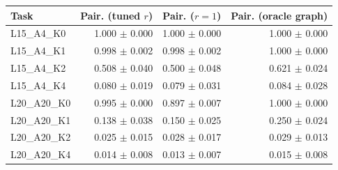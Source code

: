 \begin{tabular}{lrrr}
\toprule
Task & Pair. (tuned $r$) & Pair. ($r{=}1$) & Pair. (oracle graph)\\
\midrule
L15\_A4\_K0 & 1.000 $\pm$ 0.000 & 1.000 $\pm$ 0.000 & 1.000 $\pm$ 0.000\\
L15\_A4\_K1 & 0.998 $\pm$ 0.002 & 0.998 $\pm$ 0.002 & 1.000 $\pm$ 0.000\\
L15\_A4\_K2 & 0.508 $\pm$ 0.040 & 0.500 $\pm$ 0.048 & 0.621 $\pm$ 0.024\\
L15\_A4\_K4 & 0.080 $\pm$ 0.019 & 0.079 $\pm$ 0.031 & 0.084 $\pm$ 0.028\\
L20\_A20\_K0 & 0.995 $\pm$ 0.000 & 0.897 $\pm$ 0.007 & 1.000 $\pm$ 0.000\\
L20\_A20\_K1 & 0.138 $\pm$ 0.038 & 0.150 $\pm$ 0.025 & 0.250 $\pm$ 0.024\\
L20\_A20\_K2 & 0.025 $\pm$ 0.015 & 0.028 $\pm$ 0.017 & 0.029 $\pm$ 0.013\\
L20\_A20\_K4 & 0.014 $\pm$ 0.008 & 0.013 $\pm$ 0.007 & 0.015 $\pm$ 0.008\\
\bottomrule
\end{tabular}

